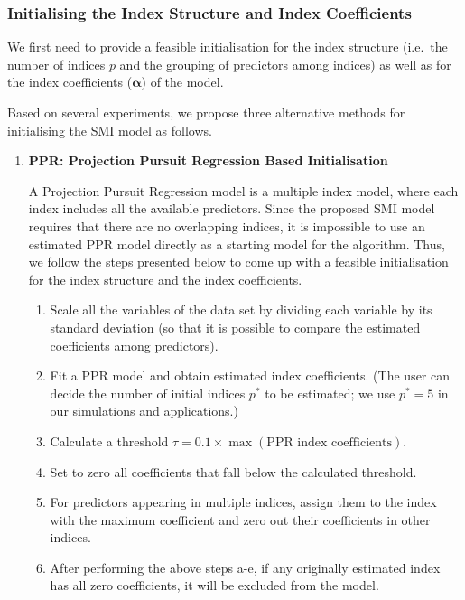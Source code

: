 \documentclass[
  11pt,
  a4paper,
]{article}
\providecommand{\tightlist}{%
  \setlength{\itemsep}{0pt}\setlength{\parskip}{0pt}}\usepackage{longtable,booktabs,array}
\begin{document}
\subsubsection{Initialising the Index Structure and Index
Coefficients}\label{sec-step1}

We first need to provide a feasible initialisation for the index
structure (i.e.~the number of indices \(p\) and the grouping of
predictors among indices) as well as for the index coefficients
(\(\bm{\alpha}\)) of the model.

Based on several experiments, we propose three alternative methods for
initialising the SMI model as follows.

\begin{enumerate}
\def\labelenumi{\arabic{enumi}.}
\item
  \textbf{PPR: Projection Pursuit Regression Based Initialisation}

  A Projection Pursuit Regression model \autocite{Friedman1981} is a
  multiple index model, where each index includes all the available
  predictors. Since the proposed SMI model requires that there are no
  overlapping indices, it is impossible to use an estimated PPR model
  directly as a starting model for the algorithm. Thus, we follow the
  steps presented below to come up with a feasible initialisation for
  the index structure and the index coefficients.

  \begin{enumerate}
  \def\labelenumii{\alph{enumii}.}
  \tightlist
  \item
    Scale all the variables of the data set by dividing each variable by
    its standard deviation (so that it is possible to compare the
    estimated coefficients among predictors).
  \item
    Fit a PPR model and obtain estimated index coefficients. (The user
    can decide the number of initial indices \(p^*\) to be estimated; we
    use \(p^* = 5\) in our simulations and applications.)
  \item
    Calculate a threshold
    \(\tau = 0.1 \times \max(\text{PPR index coefficients})\).
  \item
    Set to zero all coefficients that fall below the calculated
    threshold. 
  \item
    For predictors appearing in multiple indices, assign them to the
    index with the maximum coefficient and zero out their coefficients
    in other indices.
  \item
    After performing the above steps a-e, if any originally estimated
    index has all zero coefficients, it will be excluded from the model.
  \end{enumerate}


\end{enumerate}
\end{document}
